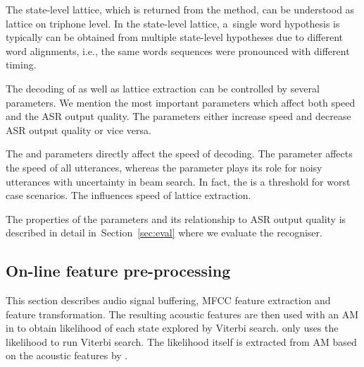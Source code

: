 The state-level lattice, which is returned from the  method, can be understood as lattice on triphone level.
In the state-level lattice, a~single word hypothesis is typically can be obtained from multiple state-level hypotheses due to different word alignments, i.e., the same words sequences were pronounced with different timing.

The decoding of  as well as lattice extraction can be controlled by several parameters.
We mention the most important parameters which affect both speed and the \ac{ASR} output quality. 
The parameters either increase speed and decrease \ac{ASR} output quality or vice versa.

The  and  parameters directly affect the speed of decoding. 
The  parameter affects the speed of all utterances, whereas the  parameter plays its role for noisy utterances with uncertainty in beam search.
In fact, the  is a threshold for worst case scenarios.
The  influences speed of lattice extraction. 

The properties of the parameters and its relationship to \ac{ASR} output quality is described in detail in~Section~\ref{sec:eval} where we evaluate the recogniser. 

\subsection{On-line feature pre-processing} 
\label{sub:preprocess}
This section describes audio signal buffering, \ac{MFCC} feature extraction and feature transformation. 
The resulting acoustic features are then used with an \ac{AM} in  to obtain likelihood of each state explored by Viterbi search.
 only uses the likelihood to run Viterbi search.
The likelihood itself is extracted from \ac{AM} based on the acoustic features by . 

